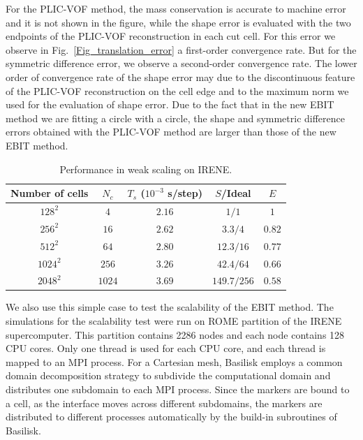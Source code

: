 For the PLIC-VOF method, the mass conservation is accurate to machine error and it is not shown in the figure, while the shape error is evaluated with the two endpoints of the PLIC-VOF reconstruction in each cut cell. For this error we observe in Fig.~\ref{Fig_translation_error} a first-order convergence rate. 
But for the symmetric difference error, we observe a second-order convergence rate. The lower order of convergence rate of the shape error may due to the discontinuous feature of the PLIC-VOF reconstruction on the cell edge and to the maximum norm we used for the evaluation of shape error.
Due to the fact that in the new EBIT method we are fitting a circle with a circle, the shape and symmetric difference errors obtained with the PLIC-VOF method are larger than those of the new EBIT method.

\begin{table}[hbt!]
\caption{Performance in weak scaling on IRENE.}
\centering
\begin{tabular}{ccccc}
\hline 
 Number of cells & $N_c$ & $T_s$ ($10^{-3}$ s/step) & $S$/Ideal  & $E$ \\ 
\hline 
$128^2$ & $4$ & $2.16$ & $1 / 1$ & $1$ \\ 
$256^2$ & $16$ & $2.62$ & $3.3 / 4$ & $0.82$ \\ 
$512^2$ & $64$ & $2.80$ & $12.3 / 16$ & $0.77$ \\ 
$1024^2$ & $256$ & $3.26$ & $42.4 / 64$ & $0.66$ \\ 
$2048^2$ & $1024$ & $3.69$ & $149.7 / 256$ & $0.58$ \\ 
\hline 
\end{tabular}
\label{Tab_weak_scaling}
\end{table}

We also use this simple case to test the scalability of the EBIT method. The simulations for the scalability test were run on ROME partition of the IRENE supercomputer. This partition contains 2286 nodes and each node contains 128 CPU cores. Only one thread is used for each CPU core, and each thread is mapped to an MPI process. 
For a Cartesian mesh, Basilisk employs a common domain decomposition strategy to subdivide the computational domain and distributes one subdomain to each MPI process. Since the markers are bound to a cell, as the interface moves across different subdomains, the markers are distributed to different processes automatically by the build-in subroutines of Basilisk.

